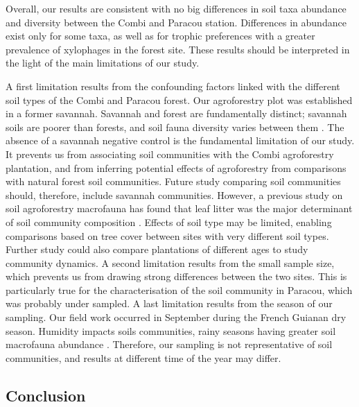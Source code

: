 \documentclass[fleqn,10pt]{ArtEcoFoG} %
\begin{document}
Overall, our results are consistent with no big differences in soil taxa abundance and diversity between the Combi and Paracou station. Differences in abundance exist only for some taxa, as well as for trophic preferences with a greater prevalence of xylophages in the forest site. These results should be interpreted in the light of the main limitations of our study.

A first limitation results from the confounding factors linked with the different soil types of the Combi and Paracou forest. Our agroforestry plot was established in a former savannah. Savannah and forest are fundamentally distinct; savannah soils are poorer than forests, and soil fauna diversity varies between them \citep{rodrigues_influence_2018}. The absence of a savannah negative control is the fundamental limitation of our study. It prevents us from associating soil communities with the Combi agroforestry plantation, and from inferring potential effects of agroforestry from comparisons with natural forest soil communities. Future study comparing soil communities should, therefore, include savannah communities. However, a previous study on soil agroforestry macrofauna has found that leaf litter was the major determinant of soil community composition \citep{moco_relationships_2010}. Effects of soil type may be limited, enabling comparisons based on tree cover between sites with very different soil types. Further study could also compare plantations of different ages to study community dynamics. A second limitation results from the small sample size, which prevents us from drawing strong differences between the two sites. This is particularly true for the characterisation of the soil community in Paracou, which was probably under sampled. A last limitation results from the season of our sampling. Our field work occurred in September during the French Guianan dry season. Humidity impacts soils communities, rainy seasons having greater soil macrofauna abundance \citep{article}. Therefore, our sampling is not representative of soil communities, and results at different time of the year may differ.

\subsection{Conclusion}\label{conclusion}
\end{document}
